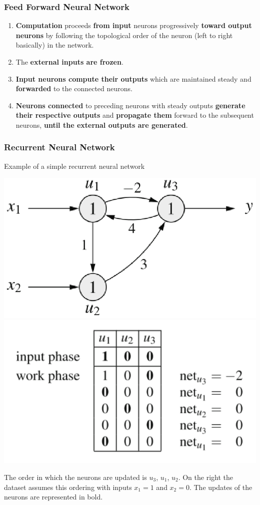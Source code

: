 \documentclass[11pt]{article}
\begin{document}
		\subsubsection{Feed Forward Neural Network}
		\begin{enumerate}
			\item \textbf{Computation} proceeds \textbf{from input} neurons progressively \textbf{toward output neurons} by following the topological order of the neuron (left to right basically) in the network.\\
			
			\item The \textbf{external inputs are frozen}.\\
			
			\item \textbf{Input neurons compute their outputs} which are maintained steady and \textbf{forwarded} to the connected neurons.\\
			
			\item \textbf{Neurons connected} to preceding neurons with steady outputs \textbf{generate their respective outputs} and \textbf{propagate them} forward to the subsequent neurons, \textbf{until the external outputs are generated}. \\
		\end{enumerate}
		
		\newpage
		
		\subsubsection{Recurrent Neural Network}
		Example of a simple recurrent neural network
		\begin{center}
			\includegraphics[width=0.45\columnwidth]{img/NN/RNN1}
			\includegraphics[width=0.45\columnwidth]{img/NN/RNN2}
		\end{center}
		The order in which the neurons are updated is $u_3$, $u_1$, $u_2$. On the right the dataset assumes this ordering with inputs $x_1 = 1$ and $x_2 = 0$. The updates of the neurons are represented in bold. \\
		
\end{document}
